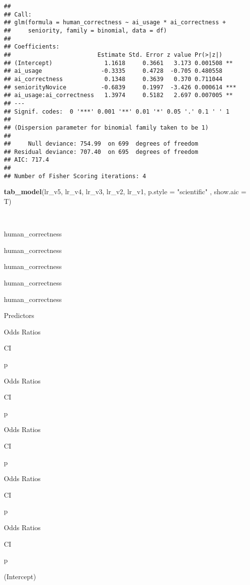 \documentclass[
]{article}
\newenvironment{Shaded}{\begin{snugshade}}{\end{snugshade}}
\newcommand{\AttributeTok}[1]{\textcolor[rgb]{0.13,0.29,0.53}{#1}}
\newcommand{\FunctionTok}[1]{\textcolor[rgb]{0.13,0.29,0.53}{\textbf{#1}}}
\newcommand{\NormalTok}[1]{#1}
\newcommand{\StringTok}[1]{\textcolor[rgb]{0.31,0.60,0.02}{#1}}
\begin{document}
\begin{verbatim}
## 
## Call:
## glm(formula = human_correctness ~ ai_usage * ai_correctness + 
##     seniority, family = binomial, data = df)
## 
## Coefficients:
##                         Estimate Std. Error z value Pr(>|z|)    
## (Intercept)               1.1618     0.3661   3.173 0.001508 ** 
## ai_usage                 -0.3335     0.4728  -0.705 0.480558    
## ai_correctness            0.1348     0.3639   0.370 0.711044    
## seniorityNovice          -0.6839     0.1997  -3.426 0.000614 ***
## ai_usage:ai_correctness   1.3974     0.5182   2.697 0.007005 ** 
## ---
## Signif. codes:  0 '***' 0.001 '**' 0.01 '*' 0.05 '.' 0.1 ' ' 1
## 
## (Dispersion parameter for binomial family taken to be 1)
## 
##     Null deviance: 754.99  on 699  degrees of freedom
## Residual deviance: 707.40  on 695  degrees of freedom
## AIC: 717.4
## 
## Number of Fisher Scoring iterations: 4
\end{verbatim}

\begin{Shaded}
\begin{Highlighting}[]
\FunctionTok{tab\_model}\NormalTok{(lr\_v5, lr\_v4, lr\_v3, lr\_v2, lr\_v1,  }\AttributeTok{p.style =} \StringTok{"scientific"}\NormalTok{ , }\AttributeTok{show.aic =}\NormalTok{ T)}
\end{Highlighting}
\end{Shaded}

~

human\_correctness

human\_correctness

human\_correctness

human\_correctness

human\_correctness

Predictors

Odds Ratios

CI

p

Odds Ratios

CI

p

Odds Ratios

CI

p

Odds Ratios

CI

p

Odds Ratios

CI

p

(Intercept)
\end{document}
